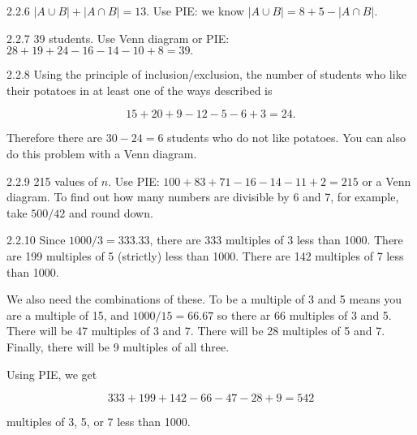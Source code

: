 \documentclass[11pt,]{book}
\theoremstyle{ptxplainnotitle}
\theoremstyle{ptxplaintitle}
\theoremstyle{ptxdefinitionnotitle}
\theoremstyle{ptxdefinitiontitle}
\theoremstyle{ptxdefinitionnotitle}
\theoremstyle{ptxdefinitiontitle}
\theoremstyle{ptxdefinitionnotitle}
\theoremstyle{ptxdefinitiontitle}
\theoremstyle{ptxdefinitiontitlenonumber}
\theoremstyle{ptxdefinitiontitlenonumber}
\numberwithin{equation}{chapter}
\newcommand{\card}[1]{\left| #1 \right|}
\begin{document}
\begin{divisionexercise}{2.2.6}
\textbf{}\hypertarget{p-1133}{}%
\(\card{A \cup B} + \card{A \cap B} = 13\text{.}\)  Use PIE: we know \(\card{A \cup B} = 8 + 5 - \card{A \cap B}\text{.}\)%
\end{divisionexercise}%
\begin{divisionexercise}{2.2.7}
\textbf{}\hypertarget{p-1139}{}%
39 students.  Use Venn diagram or PIE: \(28 + 19 + 24 - 16 - 14 - 10 + 8 = 39\text{.}\)%
\end{divisionexercise}%
\begin{divisionexercise}{2.2.8}
\textbf{}\hypertarget{p-1146}{}%
Using the principle of inclusion/exclusion, the number of students who like their potatoes in at least one of the ways described is%
\par
\hypertarget{p-1147}{}%
%
\begin{equation*}
15 + 20 + 9 - 12 - 5 - 6 + 3 = 24.
\end{equation*}
%
\par
\hypertarget{p-1148}{}%
Therefore there are \(30-24 = 6\) students who do not like potatoes. You can also do this problem with a Venn diagram.%
\end{divisionexercise}%
\begin{divisionexercise}{2.2.9}
\textbf{}\hypertarget{p-1156}{}%
215 values of \(n\text{.}\) Use PIE: \(100 + 83 + 71 - 16 - 14 -11 + 2 = 215\) or a Venn diagram. To find out how many numbers are divisible by 6 and 7, for example, take \(500/42\) and round down.%
\end{divisionexercise}%
\begin{divisionexercise}{2.2.10}
\textbf{}\hypertarget{p-1161}{}%
Since \(1000/3 = 333.33\text{,}\) there are 333 multiples of 3 less than 1000.  There are 199 multiples of 5 (strictly) less than 1000.  There are 142 multiples of 7 less than 1000.%
\par
\hypertarget{p-1162}{}%
We also need the combinations of these.  To be a multiple of 3 and 5 means you are a multiple of 15, and \(1000/15 = 66.67\) so there ar 66 multiples of 3 and 5.  There will be 47 multiples of 3 and 7.  There will be 28 multiples of 5 and 7.  Finally, there will be 9 multiples of all three.%
\par
\hypertarget{p-1163}{}%
Using PIE, we get%
\par
\hypertarget{p-1164}{}%
%
\begin{equation*}
333+199 + 142 - 66 - 47 - 28 + 9 = 542
\end{equation*}
%
\par
\hypertarget{p-1165}{}%
multiples of 3, 5, or 7 less than 1000.%
\end{divisionexercise}%
\end{document}
